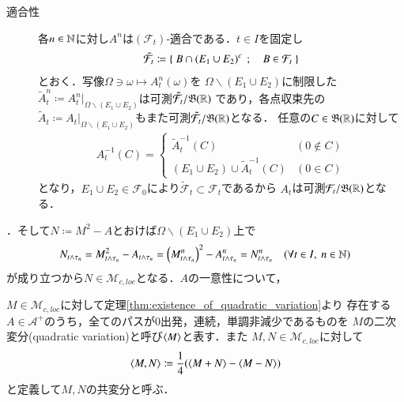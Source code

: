 \begin{prf}
\begin{description}
{\begin{description}
						\item[適合性]
							各$n \in \mathbb{N}$に対し$A^n$は$(\mathcal{F}_t)$-適合である．$t \in I$を固定し
							\begin{align}
								\tilde{\mathcal{F}}_t \coloneqq \left\{\ B \cap (E_1 \cup E_2)^c\ \, ; \quad B \in \mathcal{F}_t\ \right\}
							\end{align}
							とおく．写像$\Omega \ni \omega \longmapsto A_t^n(\omega)$を
							$\Omega \backslash (E_1 \cup E_2)$に制限した$\tilde{A}_t^n \coloneqq A_t^n|_{\Omega \backslash (E_1 \cup E_2)}$は可測$\tilde{\mathcal{F}}_t/\mathfrak{B}(\mathbb{R})$
							であり，各点収束先の$\tilde{A}_t \coloneqq A_t|_{\Omega \backslash (E_1 \cup E_2)}$もまた可測$\tilde{\mathcal{F}}_t/\mathfrak{B}(\mathbb{R})$となる．
							任意の$C \in \mathfrak{B}(\mathbb{R})$に対して
							\begin{align}
								A_t^{-1}(C) =
								\begin{cases}
									\tilde{A}_t^{-1}(C) & (0 \notin C) \\
									(E_1 \cup E_2) \cup \tilde{A}_t^{-1}(C) & (0 \in C)
								\end{cases}
							\end{align}
							となり，$E_1 \cup E_2 \in \mathcal{F}_0$により$\tilde{\mathcal{F}}_t \subset \mathcal{F}_t$であるから
							$A_t$は可測$\mathcal{F}_t/\mathfrak{B}(\mathbb{R})$となる．
					\end{description}
				}
				．そして$N \coloneqq M^2 - A$とおけば$\Omega \backslash (E_1 \cup E_2)$上で
				\begin{align}
					N_{t \wedge \tau_n} = M_{t \wedge \tau_n}^2 - A_{t \wedge \tau_n} 
					= \left( M_{t \wedge \tau_n}^n \right)^2 - A_{t \wedge \tau_n}^n
					= N_{t \wedge \tau_n}^n \quad (\forall t \in I,\ n \in \mathbb{N})
				\end{align}
				が成り立つから$N \in \mathcal{M}_{c,loc}$となる．$A$の一意性について，
		\end{description}
	\end{prf}
	
	\begin{screen}
		\begin{dfn}[二次変分]
			$M \in \mathcal{M}_{c,loc}$に対して定理\ref{thm:existence_of_quadratic_variation}より
			存在する$A \in \mathcal{A}^+$のうち，全てのパスが$0$出発，連続，単調非減少であるものを
			$M$の二次変分(quadratic variation)と呼び$\inprod<M>$と表す．また
			$M,N \in \mathcal{M}_{c,loc}$に対して
			\begin{align}
				\inprod<M,N> \coloneqq \frac{1}{4} (\inprod<M+N> - \inprod<M-N>)
			\end{align}
			と定義して$M,N$の共変分と呼ぶ．
		\end{dfn}
	\end{screen}
	